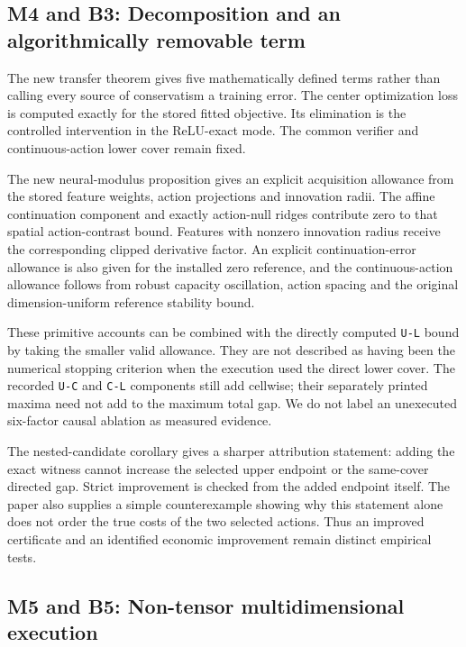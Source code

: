 \hypertarget{m4-and-b3-decomposition-and-an-algorithmically-removable-term}{%
\subsection{M4 and B3: Decomposition and an algorithmically removable
term}\label{m4-and-b3-decomposition-and-an-algorithmically-removable-term}}

The new transfer theorem gives five mathematically defined terms rather
than calling every source of conservatism a training error. The center
optimization loss is computed exactly for the stored fitted objective.
Its elimination is the controlled intervention in the ReLU-exact mode.
The common verifier and continuous-action lower cover remain fixed.

The new neural-modulus proposition gives an explicit acquisition
allowance from the stored feature weights, action projections and
innovation radii. The affine continuation component and exactly
action-null ridges contribute zero to that spatial action-contrast
bound. Features with nonzero innovation radius receive the corresponding
clipped derivative factor. An explicit continuation-error allowance is
also given for the installed zero reference, and the continuous-action
allowance follows from robust capacity oscillation, action spacing and
the original dimension-uniform reference stability bound.

These primitive accounts can be combined with the directly computed
\texttt{U-L} bound by taking the smaller valid allowance. They are not
described as having been the numerical stopping criterion when the
execution used the direct lower cover. The recorded \texttt{U-C} and
\texttt{C-L} components still add cellwise; their separately printed
maxima need not add to the maximum total gap. We do not label an
unexecuted six-factor causal ablation as measured evidence.

The nested-candidate corollary gives a sharper attribution statement:
adding the exact witness cannot increase the selected upper endpoint or
the same-cover directed gap. Strict improvement is checked from the
added endpoint itself. The paper also supplies a simple counterexample
showing why this statement alone does not order the true costs of the
two selected actions. Thus an improved certificate and an identified
economic improvement remain distinct empirical tests.

\hypertarget{m5-and-b5-non-tensor-multidimensional-execution}{%
\subsection{M5 and B5: Non-tensor multidimensional
execution}\label{m5-and-b5-non-tensor-multidimensional-execution}}

